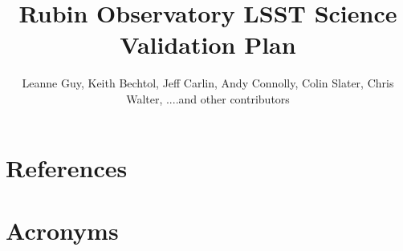 \documentclass[DM,lsstdraft,toc]{lsstdoc}
\title{Rubin Observatory LSST Science Validation Plan}
\author{%
Leanne Guy, Keith Bechtol, Jeff Carlin, Andy Connolly, Colin Slater, Chris Walter, ....and other contributors
}
\date{\vcsDate}
\begin{document}
\maketitle





\appendix
\section{References} \label{sec:bib}
\renewcommand{\refname}{} %


\section{Acronyms} \label{sec:acronyms}

\end{document}
